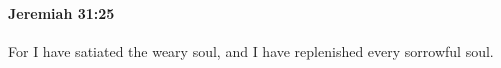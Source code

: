 
		\paragraph{Jeremiah 31:25} %
			\label{JEREMIAH-31-25}

			For I have satiated the weary soul, and I have replenished every sorrowful soul.


